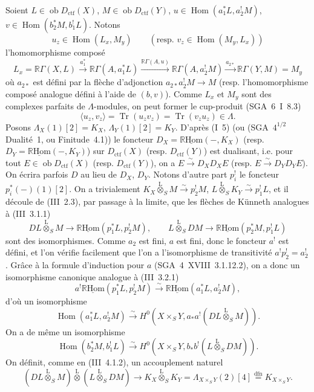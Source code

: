 \documentclass[11pt]{article}
\DeclareMathOperator{\Hom}{Hom}
\newcommand{\R}{\mathbb{R}}\newcommand{\RHomCore}{\mathbb{R}\mathrm{Hom}}
\newcommand{\ob}{\operatorname{ob}}
\providecommand{\RHom}{\RHomCore}
\providecommand{\uRHom}{\underline{\RHom}}
\providecommand{\ctf}{\mathrm{ctf}}
\providecommand{\Tr}{\operatorname{Tr}}
\providecommand{\Tr}{\operatorname{Tr}}
\providecommand{\lten}{\overset{\mathrm L}{\otimes}}
\providecommand{\Tr}{\operatorname{Tr}}
\providecommand{\RHom}{\RHomCore}
\providecommand{\Hom}{\operatorname{Hom}}
\providecommand{\ob}{\operatorname{ob}}
\providecommand{\lten}{\overset{\mathrm L}{\otimes}}
\providecommand{\RHom}{\R\mathcal{H}om}
\providecommand{\lten}{\overset{\mathrm L}{\otimes}}
\providecommand{\R}{\mathrm R}
\providecommand{\Tr}{\operatorname{Tr}}
\providecommand{\lten}{\overset{\mathrm L}{\otimes}}
\providecommand{\lten}{\overset{\mathrm L}{\otimes}}
\providecommand{\lten}{\overset{\mathrm L}{\otimes}}
\providecommand{\RHom}{\RHomCore}
\providecommand{\Hom}{\operatorname{Hom}}
\providecommand{\Tr}{\operatorname{Tr}}
\providecommand{\lten}{\overset{\mathrm L}{\otimes}}
\begin{document}
Soient $L\in \ob D_{\ctf}(X)$, $M\in \ob D_{\ctf}(Y)$, $u\in\Hom(a_1^*L,a_2^!M)$, $v\in\Hom(b_2^*M,b_1^!L)$. Notons
\[
u_z\in\Hom(L_x,M_y)\qquad (\text{resp. }v_z\in\Hom(M_y,L_x))
\]
l'homomorphisme composé
\[
L_x=\R\Gamma(X,L)\xrightarrow{a_1^*}\R\Gamma(A,a_1^*L)
\xrightarrow{\R\Gamma(A,u)}\R\Gamma(A,a_2^!M)
\xrightarrow{a_{2*}}\R\Gamma(Y,M)=M_y
\]
où $a_{2*}$ est défini par la flèche d'adjonction $a_{2*}a_2^!M\to M$ (resp. l'homomorphisme composé analogue défini à l'aide de $(b,v)$). Comme $L_x$ et $M_y$ sont des complexes parfaits de $\Lambda$-modules, on peut former le cup-produit (SGA~6~I~8.3)
\begin{equation}\tag{1.1.1}
\langle u_z,v_z\rangle=\Tr(u_zv_z)=\Tr(v_zu_z)\in\Lambda.
\end{equation}
Posons $\Lambda_X(1)[2]=K_X$, $\Lambda_Y(1)[2]=K_Y$. D'après (I~5) (ou (SGA~$4^{1/2}$ Dualité~1, ou Finitude~4.1)) le foncteur $D_X=\uRHom(-,K_X)$ (resp. $D_Y=\uRHom(-,K_Y)$) sur 
$D_{\ctf}(X)$ (resp. $D_{\ctf}(Y)$) est dualisant, i.e. pour tout $E\in\ob D_{\ctf}(X)$ (resp. $D_{\ctf}(Y)$), on a $E\xrightarrow{\sim}D_XD_XE$ (resp. $E\xrightarrow{\sim}D_YD_YE$). On écrira parfois $D$ au
lieu de $D_X$, $D_Y$. Notons d'autre part $p_i^!$ le foncteur $p_i^*(-)(1)[2]$. On a trivialement $K_X\lten_SM\xrightarrow{\sim}p_2^!M$, $L\lten_SK_Y\xrightarrow{\sim}p_1^!L$, et il découle de (III~2.3), par passage à la limite, que les flèches de Künneth analogues à (III~3.1.1)
\[
DL\lten_SM\longrightarrow \uRHom(p_1^*L,p_2^!M),
\qquad
L\lten_SDM\longrightarrow \uRHom(p_2^*M,p_1^!L)
\]
sont des isomorphismes. Comme $a_2$ est fini, $a$ est fini, donc le foncteur $a^!$ est défini, et l'on vérifie facilement que l'on a l'isomorphisme de transitivité $a^!p_2^!=a_2^!$. Grâce à la formule d'induction pour $a$ (SGA~4~XVIII~3.1.12.2), on a donc un isomorphisme canonique analogue à (III~3.2.1)
\[
a^!\uRHom(p_1^*L,p_2^!M)\xrightarrow{\sim}\uRHom(a_1^*L,a_2^!M),
\]
d'où un isomorphisme
\begin{equation}\tag{*}
\Hom(a_1^*L,a_2^!M)\xrightarrow{\sim}H^0(X\times_S Y,a_*a^!(DL\lten_SM)).
\end{equation}
On a de même un isomorphisme
\begin{equation}\tag{**}
\Hom(b_2^*M,b_1^!L)\xrightarrow{\sim}H^0(X\times_S Y,b_*b^!(L\lten_SDM)).
\end{equation}
On définit, comme en (III~4.1.2), un accouplement naturel
\[
(DL\lten_SM)\lten(L\lten_SDM)
\longrightarrow K_X\lten_SK_Y=\Lambda_{X\times_S Y}(2)[4]\stackrel{\mathrm{dfn}}{=}K_{X\times_S Y}.
\]
\end{document}
